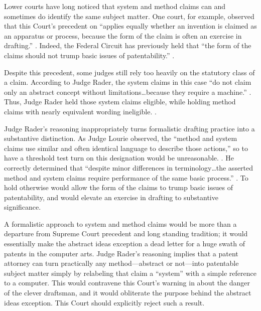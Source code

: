 \documentclass{scotus}
\begin{document}
Lower courts have long noticed that system and method claims can and sometimes
do identify the same subject matter.  One court, for example, observed
that this Court's precedent on  ``applies equally whether an
invention is claimed as an apparatus or process, because the form of the claim
is often an exercise in drafting.'' . Indeed, the Federal Circuit has previously held
that ``the form of the claims should not trump basic issues of patentability.''
.

Despite this precedent, some judges still rely too heavily on
the statutory class of a claim.  According to Judge Rader,
the system claims in this case “do not claim only an abstract concept without
limitations\ldots because they require a machine.” . Thus, Judge Rader held those system claims eligible, while holding
method claims with nearly equivalent wording ineligible. .

Judge Rader’s reasoning inappropriately turns formalistic drafting practice into
a substantive distinction.  As Judge Lourie observed, the “method and system
claims use similar and often identical language to describe those actions,” so
to have a threshold test turn on this designation would be unreasonable.
. He correctly determined that “despite minor
differences in terminology\ldots the asserted method and system claims require
performance of the same basic process.” .  To hold
otherwise would allow the form of the claims to trump basic issues of
patentability, and would elevate an exercise in drafting to substantive
significance.

A formalistic approach to system and method claims would be more than a
departure from Supreme Court precedent and long standing tradition; it would
essentially make the abstract ideas exception a dead letter for a huge swath of
patents in the computer arts. Judge Rader’s reasoning implies that a patent
attorney can turn practically any method---abstract or not---into patentable
subject matter simply by relabeling that claim a “system” with a simple
reference to a computer.  This would contravene this Court's warning
in 
about the danger of the clever draftsman, and it would obliterate the purpose
behind the
abstract ideas exception. This Court should explicitly reject such a result.
\end{document}
